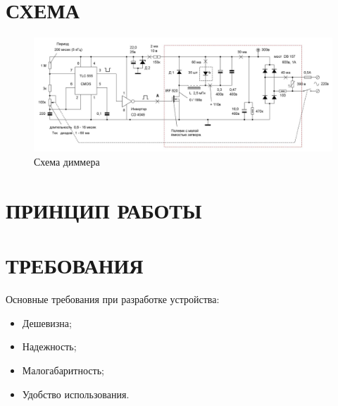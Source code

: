 \documentclass[a4paper,14pt]{article}
\begin{document}
\newpage


\section{СХЕМА}

\begin{figure}[H]
	\centering
	\includegraphics[width=1\linewidth]{image/sh.jpg}
	\caption{Схема диммера}
	\label{fig:sh}
\end{figure}

\newpage

\section{ПРИНЦИП РАБОТЫ}


\newpage
\section{ТРЕБОВАНИЯ}

Основные требования при разработке устройства:

\begin{itemize}
	\item Дешевизна;
	\item Надежность;
	\item Малогабаритность;
	\item Удобство использования.
\end{itemize}


\end{document}
